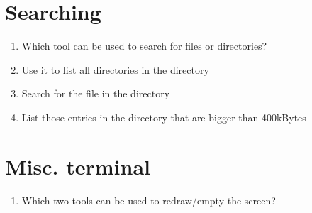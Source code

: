 \documentclass[a4paper,11pt,english]{sphinxmanual}
\begin{document}
\section{Searching}
\label{exercises/exercises_beginner:searching}\begin{enumerate}
\item {} 
Which tool can be used to search for files or directories?

\item {} 
Use it to list all directories in the  directory

\item {} 
Search for the file  in the  directory

\item {} 
List those entries in the directory  that are bigger than 400kBytes

\end{enumerate}


\section{Misc. terminal}
\label{exercises/exercises_beginner:misc-terminal}\begin{enumerate}
\item {} 
Which two tools can be used to redraw/empty the screen?

\end{enumerate}
\end{document}
